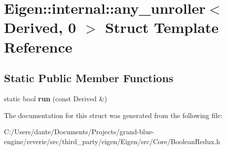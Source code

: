 \hypertarget{struct_eigen_1_1internal_1_1any__unroller_3_01_derived_00_010_01_4}{}\section{Eigen\+::internal\+::any\+\_\+unroller$<$ Derived, 0 $>$ Struct Template Reference}
\label{struct_eigen_1_1internal_1_1any__unroller_3_01_derived_00_010_01_4}
\subsection*{Static Public Member Functions}
\begin{DoxyCompactItemize}
\item 
\mbox{\label{struct_eigen_1_1internal_1_1any__unroller_3_01_derived_00_010_01_4_ad3879ef2538193fffda30e6115e11fd4}} 
static bool {\bfseries run} (const Derived \&)
\end{DoxyCompactItemize}


The documentation for this struct was generated from the following file\+:\begin{DoxyCompactItemize}
\item 
C\+:/\+Users/dante/\+Documents/\+Projects/grand-\/blue-\/engine/reverie/src/third\+\_\+party/eigen/\+Eigen/src/\+Core/Boolean\+Redux.\+h\end{DoxyCompactItemize}
